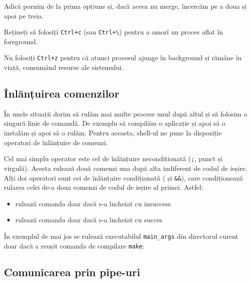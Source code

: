 Adică pornim de la prima opțiune și, dacă aceea nu merge, încercăm pe a doua și
apoi pe treia.

\begin{note}
Rețineți să folosiți \texttt{Ctrl+c} (sau \texttt{Ctrl+\textbackslash{}}) pentru a omorî un proces aflat în foreground.

Nu folosiți \texttt{Ctrl+z} pentru că atunci procesul ajunge în background și rămâne în
viață, consumând resurse ale sistemului.
\end{note}

\subsection{Înlănțuirea comenzilor}
\label{sec:procese-operatii-inlantuire}

În unele situații dorim să rulăm mai multe procese unul după altul și să folosim
o singură linie de comandă. De exemplu să compilăm o aplicație și apoi să o
instalăm și apoi să o rulăm. Pentru aceasta, shell-ul ne pune la dispoziție
operatori de înlănțuire de comenzi.

Cel mai simplu operator este cel de înlănțuire necondiționată (\texttt{;}, punct și virgulă). Acesta
rulează două comenzi una după alta indiferent de codul de ieșire. Alți doi
operatori sunt cei de înlănțuire condiționată (\texttt{\textbar{}\textbar{}} și \texttt{\&\&}), care condiționează rularea celei
de-a doua comenzi de codul de ieșire al primei. Astfel:

\begin{itemize}
  \item {} rulează comanda  doar dacă  s-a încheiat
		cu insuccess
  \item {} rulează comanda  doar dacă  s-a
		încheiat cu succes
\end{itemize}

În exemplul de mai jos se rulează executabilul \texttt{main_args} din directorul curent doar dacă a reușit comanda de compilare \texttt{make}:

\subsection{Comunicarea prin pipe-uri}
\label{sec:procese-operatii-pipe}


